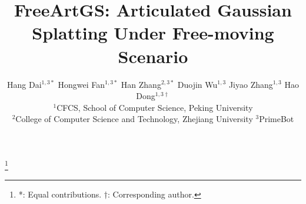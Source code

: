 \documentclass[10pt,twocolumn,letterpaper]{article}
\title{FreeArtGS: Articulated Gaussian Splatting Under Free-moving Scenario}
\author{
Hang Dai$^{1,3*}$ \quad
Hongwei Fan$^{1,3*}$ \quad
Han Zhang$^{2,3*}$ \quad
Duojin Wu$^{1,3}$ \quad
Jiyao Zhang$^{1,3}$ \quad
Hao Dong$^{1,3\dag}$ \\
$^{1}$CFCS, School of Computer Science, Peking University \quad \\
$^{2}$College of Computer Science and Technology, Zhejiang University \quad
$^{3}$PrimeBot}
\begin{document}
\maketitle
  
\renewcommand{\thefootnote}{}
\footnote{*: Equal contributions. $\dagger$: Corresponding author.}







{
    \small
    
    
}


\end{document}
